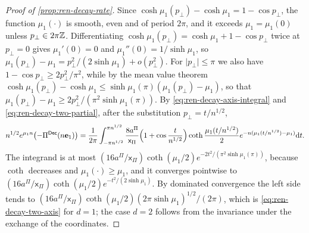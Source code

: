 \begin{proof}[Proof of \cref{prop:ren-decay-rate}]
Since $\cosh\mu_1(p_\perp)-\cosh\mu_1=1-\cos p_\perp$, the function $\mu_1(\cdot)$ is smooth, even and of period $2\pi$, and it exceeds $\mu_1=\mu_1(0)$ unless $p_\perp\in2\pi\mathbb{Z}$. Differentiating $\cosh\mu_1(p_\perp)=\cosh\mu_1+1-\cos p_\perp$ twice at $p_\perp=0$ gives $\mu_1'(0)=0$ and $\mu_1''(0)=1/\sinh\mu_1$, so $\mu_1(p_\perp)-\mu_1=p_\perp^2/(2\sinh\mu_1)+o(p_\perp^2)$. For $\lvert p_\perp\rvert\le\pi$ we also have $1-\cos p_\perp\ge2p_\perp^2/\pi^2$, while by the mean value theorem $\cosh\mu_1(p_\perp)-\cosh\mu_1\le\sinh\mu_1(\pi)(\mu_1(p_\perp)-\mu_1)$, so that $\mu_1(p_\perp)-\mu_1\ge2p_\perp^2/(\pi^2\sinh\mu_1(\pi))$. By \eqref{eq:ren-decay-axis-integral} and \eqref{eq:ren-decay-two-partial}, after the substitution $p_\perp=t/n^{1/2}$,
\[
n^{1/2}e^{\mu_1n}\bigl(-\Pi^{\mathsf{Dec}}(n\mathbf e_1)\bigr)=\frac1{2\pi}\int_{-\pi n^{1/2}}^{\pi n^{1/2}}\frac{8a^\Pi}{\mathsf x_\Pi}\Bigl(1+\cos\frac t{n^{1/2}}\Bigr)\coth\frac{\mu_1(t/n^{1/2})}2e^{-n(\mu_1(t/n^{1/2})-\mu_1)}\mathrm dt.
\]
The integrand is at most $(16a^\Pi/\mathsf x_\Pi)\coth(\mu_1/2)e^{-2t^2/(\pi^2\sinh\mu_1(\pi))}$, because $\coth$ decreases and $\mu_1(\cdot)\ge\mu_1$, and it converges pointwise to $(16a^\Pi/\mathsf x_\Pi)\coth(\mu_1/2)e^{-t^2/(2\sinh\mu_1)}$. By dominated convergence the left side tends to $(16a^\Pi/\mathsf x_\Pi)\coth(\mu_1/2)(2\pi\sinh\mu_1)^{1/2}/(2\pi)$, which is \eqref{eq:ren-decay-two-axis} for $d=1$; the case $d=2$ follows from the invariance under the exchange of the coordinates.
\end{proof}

